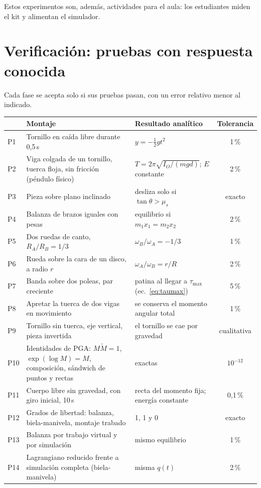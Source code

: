 \documentclass[11pt,a4paper]{article}
\numberwithin{equation}{section}
\begin{document}
\smallskip
Estos experimentos son, además, actividades para el aula: los estudiantes miden el kit y alimentan el simulador.

\section{Verificación: pruebas con respuesta conocida}\label{sec:verificacion}

Cada fase se acepta solo si sus pruebas pasan, con un error relativo menor al indicado.

\begin{tabularx}{\linewidth}{@{}l Y l c@{}}
\toprule
& \textbf{Montaje} & \textbf{Resultado analítico} & \textbf{Tolerancia}\\
\midrule
P1 & Tornillo en caída libre durante 0,5\,s & $y = -\tfrac12 g t^2$ & 1\,\%\\
P2 & Viga colgada de un tornillo, tuerca floja, sin fricción (péndulo físico) &
  $T = 2\pi\sqrt{I_O/(m g d)}$; $E$ constante & 2\,\%\\
P3 & Pieza sobre plano inclinado & desliza solo si $\tan\theta > \mu_s$ & exacto\\
P4 & Balanza de brazos iguales con pesas & equilibrio si $m_1 x_1 = m_2 x_2$ & 2\,\%\\
P5 & Dos ruedas de canto, $R_A/R_B = 1/3$ & $\omega_B/\omega_A = -1/3$ & 1\,\%\\
P6 & Rueda sobre la cara de un disco, a radio $r$ & $\omega_A/\omega_B = r/R$ & 2\,\%\\
P7 & Banda sobre dos poleas, par creciente & patina al llegar a $\tau_{\max}$ (ec.~\ref{eq:taumax}) & 5\,\%\\
P8 & Apretar la tuerca de dos vigas en movimiento & se conserva el momento angular total & 1\,\%\\
P9 & Tornillo sin tuerca, eje vertical, pieza invertida & el tornillo se cae por gravedad & cualitativa\\
P10 & Identidades de PGA: $M\widetilde M = 1$, $\exp(\log M) = M$, composición, sándwich de puntos y rectas & exactas & $10^{-12}$\\
P11 & Cuerpo libre sin gravedad, con giro inicial, 10\,s & recta del momento fija; energía constante & 0,1\,\%\\
P12 & Grados de libertad: balanza, biela-manivela, montaje trabado & 1, 1 y 0 & exacto\\
P13 & Balanza por trabajo virtual y por simulación & mismo equilibrio & 1\,\%\\
P14 & Lagrangiano reducido frente a simulación completa (biela-manivela) & misma $q(t)$ & 2\,\%\\
\bottomrule
\end{tabularx}
\end{document}
